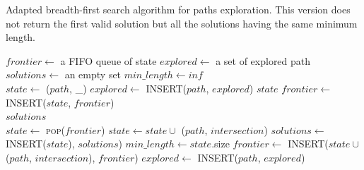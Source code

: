 \begin{algorithm}[ht!]
\caption{Adapted breadth-first search algorithm for paths exploration. This version does not return the first valid solution but all the solutions having the same minimum length.}
\label{alg:chap3_path_search}
\begin{algorithmic}[1]
    \State $frontier\leftarrow$ a FIFO queue of state
    \State $explored\leftarrow$ a set of explored path
    \State $solutions\leftarrow$ an empty set
    \State $min\_length \leftarrow inf$ 
    \\
    	\State $state \leftarrow$ ($path$, \_) 
    	\State $explored\leftarrow$ \textsc{INSERT}($path$, $explored$)
    		\State \Return $state$
    	\Else
    		\State $frontier\leftarrow$ \textsc{INSERT}($state$, $frontier$)
    	\EndIf
    \EndFor
    \\
    \Loop
        	\State \Return $solutions$
        \EndIf
        \\
        \State $state\leftarrow$ \textsc{pop}($frontier$)
        			\State $state \leftarrow state \cup$ ($path$, $intersection$)
        				\State $solutions\leftarrow$ \textsc{INSERT}($state$), $solutions$)
        				\State $min\_length \leftarrow state$.size
        			\EndIf
        			\State $frontier\leftarrow$ \textsc{INSERT}($state \cup$ ($path$, $intersection$), $frontier$)
        			\State $explored\leftarrow$ \textsc{INSERT}($path$, $explored$)
        		\EndIf
        	\EndFor
        \EndFor
    \EndLoop
\EndFunction
\end{algorithmic}
\end{algorithm}

